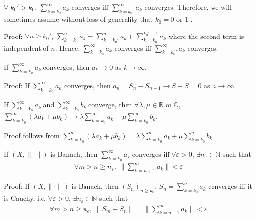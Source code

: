 \documentclass{tufte-handout}
\begin{document}
\begin{Proposition}
    \( \forall \; k_0' > k_0 \), \(\sum_{k=k_0}^{\infty}a_k\) converges iff \(\sum_{k=k_0'}^{\infty}a_k\) converges.
    Therefore, we will sometimes assume without loss of generality that \( k_0 = 0 \) or \(1 \) .
\end{Proposition}
Proof: 
\(\forall n \geq k_0'\), 
\(\sum_{k=k_0}^{n} a_k = \sum_{k=k_0'}^{n} a_k + \sum_{k=k_0}^{k_0'-1}a_k\)
where the second term is independent of \( n \).
Hence, \(\sum_{k=k_0}^{\infty}a_k\) converges iff \(\sum_{k=k_0'}^{\infty}a_k\) converges.

\hfill\qedsymbol

\begin{Proposition}
    If \(\sum_{k=k_0}^{\infty}a_k\) converges, then \( a_k \to 0 \) as \( k \to \infty \).
\end{Proposition}
Proof: If \(\sum_{k=k_0}^{\infty}a_k\) converges, then \( a_n = S_n - S_{n-1} \to S - S = 0 \) as \( n \to \infty \).
\hfill\qedsymbol

\begin{Proposition}
    If \(\sum_{k=k_0}^{\infty}a_k\) and \(\sum_{k=k_0}^{\infty}b_k\) converge, 
    then \(\forall \lambda, \mu \in \mathbb{R}\) or \( \mathbb{C} \),
    \(\sum_{k=k_0}^{\infty}(\lambda a_k + \mu b_k) \to 
    \lambda \sum_{k=k_0}^{\infty}a_k + \mu \sum_{k=k_0}^{\infty}b_k\).
\end{Proposition}
Proof follows from \(
\sum_{k=k_0}^{n}(\lambda a_k + \mu b_k) = \lambda \sum_{k=k_0}^{n}a_k + \mu \sum_{k=k_0}^{n}b_k
\).
\hfill \qedsymbol

\begin{Theorem}
    If \((X, \|\cdot\|)\) is Banach, then \(\sum_{k=k_0}^{\infty}a_k\) converges iff
    \(\forall \varepsilon > 0\), \(\exists n_\varepsilon \in \mathbb{N}\) such that
    \begin{align}
        \forall m > n \geq n_\varepsilon, \; \|\sum_{k=n+1}^{m}a_k\| < \varepsilon
    \end{align}
\end{Theorem}
Proof: If \((X, \|\cdot\|)\) is Banach, then \((S_n)_{n\geq k_0}\), 
\(S_n = \sum_{k=k_0}^{n}a_k\) converges iff it is Cauchy, i.e.
\(\forall \varepsilon > 0\), \(\exists n_\varepsilon \in \mathbb{N}\) such that
\begin{align}
    \forall m > n \geq n_\varepsilon, \; \|S_m - S_n\|= \|\sum_{k=n+1}^{m}a_k\|
     < \varepsilon
\end{align}
\hfill \qedsymbol
\end{document}
